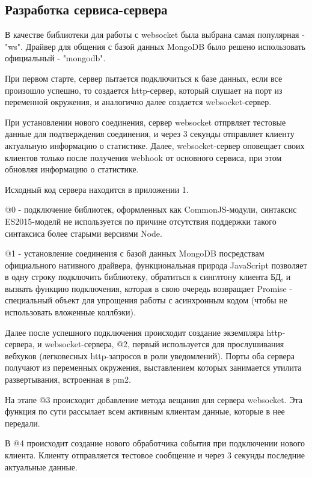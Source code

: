 \documentclass[a4paper, 12pt]{article}
\begin{document}
    \subsection*{Разработка сервиса-сервера}
    В качестве библиотеки для работы с websocket была выбрана самая популярная - "ws". Драйвер для общения с базой
    данных MongoDB было решено использовать официальный - "mongodb".

    При первом старте, сервер пытается подключиться к базе данных, если все произошло успешно, то создается http-сервер,
    который слушает на порт из переменной окружения, и аналогично далее создается websocket-сервер.

    При установлении нового соединения, сервер websocket отпрвляет тестовые данные для подтверждения соединения,
    и через 3 секунды отправляет клиенту актуальную информацию о статистике. Далее, websocket-сервер оповещает
    своих клиентов только после получения webhook от основного сервиса, при этом обновляя информацию о статистике.

    Исходный код сервера находится в приложении 1.

    @0 - подключение библиотек, оформленных как CommonJS-модули, синтаксис ES2015-моделй не используется по причине
    отсутствия поддержки такого синтаксиса более старыми версиями Node.

    @1 - установление соединения с базой данных MongoDB посредствам официального нативного драйвера, функциональная природа
    JavaScript позволяет в одну строку подключить библиотеку, обратиться к синглтону клиента БД, и вызвать функцию подключения,
    которая в свою очередь возвращает Promise - специальный объект для упрощения работы с асинхронным кодом (чтобы не
    использовать вложенные коллбэки).

    Далее после успешного подключения происходит создание экземпляра http-сервера, и
    websocket-сервера, @2, первый используется для прослушивания вебхуков (легковесных http-запросов в роли уведомлений).
    Порты оба сервера получают из переменных окружения, выставлением которых занимается утилита развертывания, встроенная в pm2.

    На этапе @3 происходит добавление метода вещания для сервера websocket. Эта функция по сути рассылает всем активным клиентам
    данные, которые в нее передали.

    В @4 происходит создание нового обработчика события при подключении нового клиента. Клиенту отправляется тестовое сообщение
    и через 3 секунды последние актуальные данные.
\end{document}
